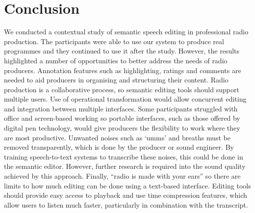 \section{Conclusion}\label{sec:conclusion}
We conducted a contextual study of semantic speech editing in professional radio production. The participants were able
to use our system to produce real programmes and they continued to use it after the study.  However, the results
highlighted a number of opportunities to better address the needs of radio producers.
Annotation features such as highlighting, ratings and comments are needed to aid producers in organising and
structuring their content.
Radio production is a collaborative process, so semantic editing tools should support multiple users. Use of
operational transformation would allow concurrent editing and integration between multiple interfaces.
Some participants struggled with office and screen-based working so portable interfaces, such as those offered by
digital pen technology, would give producers the flexibility to work where they are most productive. 
Unwanted noises such as `umms' and breaths must be removed transparently, which is done by the producer or sound
engineer. By training speech-to-text systems to transcribe these noises, this could be done in the semantic editor.
However, further research is required into the sound quality achieved by this approach.
Finally, ``radio is made with your ears'' so there are limits to how much editing can be done using a text-based
interface. Editing tools should provide easy access to playback and use time compression features, which allow users to
listen much faster, particularly in combination with the transcript.


